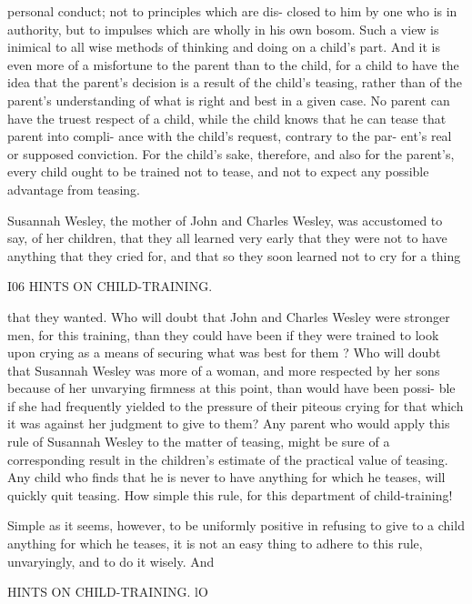 \documentclass[
]{book}
\begin{document}
personal conduct; not to principles which are dis- closed to him by one who is in authority, but to impulses which are wholly in his own bosom. Such a view is inimical to all wise methods of thinking and doing on a child's part. And it is even more of a misfortune to the parent than to the child, for a child to have the idea that the parent's decision is a result of the child's teasing, rather than of the parent's understanding of what is right and best in a given case. No parent can have the truest respect of a child, while the child knows that he can tease that parent into compli- ance with the child's request, contrary to the par- ent's real or supposed conviction. For the child's sake, therefore, and also for the parent's, every child ought to be trained not to tease, and not to expect any possible advantage from teasing.

Susannah Wesley, the mother of John and Charles Wesley, was accustomed to say, of her children, that they all learned very early that they were not to have anything that they cried for, and that so they soon learned not to cry for a thing

I06 HINTS ON CHILD-TRAINING.

that they wanted. Who will doubt that John and Charles Wesley were stronger men, for this training, than they could have been if they were trained to look upon crying as a means of securing what was best for them ? Who will doubt that Susannah Wesley was more of a woman, and more respected by her sons because of her unvarying firmness at this point, than would have been possi- ble if she had frequently yielded to the pressure of their piteous crying for that which it was against her judgment to give to them? Any parent who would apply this rule of Susannah Wesley to the matter of teasing, might be sure of a corresponding result in the children's estimate of the practical value of teasing. Any child who finds that he is never to have anything for which he teases, will quickly quit teasing. How simple this rule, for this department of child-training!

Simple as it seems, however, to be uniformly positive in refusing to give to a child anything for which he teases, it is not an easy thing to adhere to this rule, unvaryingly, and to do it wisely. And

HINTS ON CHILD-TRAINING. lO
\end{document}
